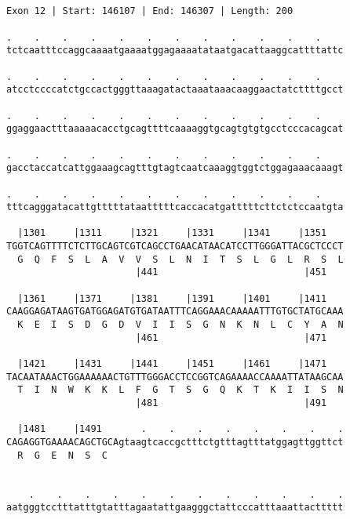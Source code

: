\documentclass{article}
\begin{document}
\begin{Verbatim}
                               
 
Exon 12 | Start: 146107 | End: 146307 | Length: 200
 
.    .    .    .    .    .    .    .    .    .    .    .    
tctcaatttccaggcaaaatgaaaatggagaaaatataatgacattaaggcattttattc
                                                            
.    .    .    .    .    .    .    .    .    .    .    .    
atcctccccatctgccactgggttaaagatactaaataaacaaggaactatcttttgcct
                                                            
.    .    .    .    .    .    .    .    .    .    .    .    
ggaggaactttaaaaacacctgcagttttcaaaaggtgcagtgtgtgcctcccacagcat
                                                            
.    .    .    .    .    .    .    .    .    .    .    .    
gacctaccatcattggaaagcagtttgtagtcaatcaaaggtggtctggagaaacaaagt
                                                            
.    .    .    .    .    .    .    .    .    .    .    .    
tttcagggatacattgtttttataatttttcaccacatgatttttcttctctccaatgta
                                                            
  |1301     |1311     |1321     |1331     |1341     |1351   
TGGTCAGTTTTCTCTTGCAGTCGTCAGCCTGAACATAACATCCTTGGGATTACGCTCCCT
  G  Q  F  S  L  A  V  V  S  L  N  I  T  S  L  G  L  R  S  L
                       |441                          |451   
  
  |1361     |1371     |1381     |1391     |1401     |1411   
CAAGGAGATAAGTGATGGAGATGTGATAATTTCAGGAAACAAAAATTTGTGCTATGCAAA
  K  E  I  S  D  G  D  V  I  I  S  G  N  K  N  L  C  Y  A  N
                       |461                          |471   
  
  |1421     |1431     |1441     |1451     |1461     |1471   
TACAATAAACTGGAAAAAACTGTTTGGGACCTCCGGTCAGAAAACCAAAATTATAAGCAA
  T  I  N  W  K  K  L  F  G  T  S  G  Q  K  T  K  I  I  S  N
                       |481                          |491   
  
  |1481     |1491       .    .    .    .    .    .    .    .
CAGAGGTGAAAACAGCTGCAgtaagtcaccgctttctgtttagtttatggagttggttct
  R  G  E  N  S  C                                          
                                                            
  
    .    .    .    .    .    .    .    .    .    .    .    .
aatgggtcctttatttgtatttagaatattgaagggctattcccatttaaattacttttt
                                                            

\end{Verbatim}
\end{document}
